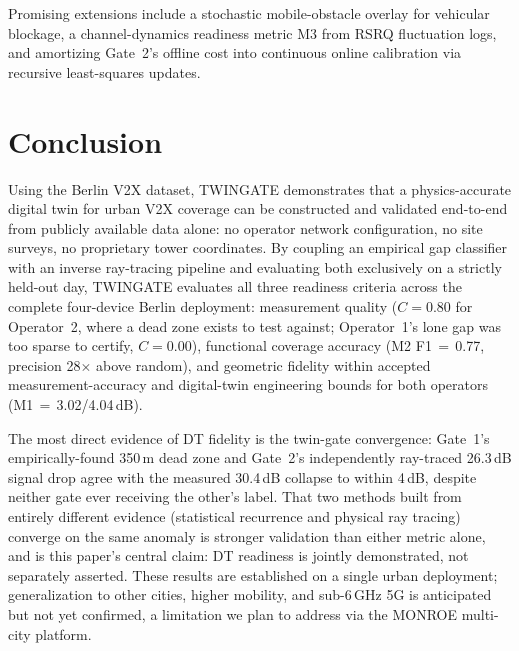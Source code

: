 \documentclass[conference]{IEEEtran}
\begin{document}
Promising extensions include a stochastic mobile-obstacle overlay for
vehicular blockage, a channel-dynamics readiness metric M3 from RSRQ
fluctuation logs, and amortizing Gate~2's offline cost into continuous
online calibration via recursive least-squares updates.

\section{Conclusion}
\label{sec:conclusion}

Using the Berlin V2X dataset, TWINGATE demonstrates that a
physics-accurate digital twin for urban V2X coverage can be constructed
and validated end-to-end from publicly available data alone: no
operator network configuration, no site surveys, no proprietary tower
coordinates.
By coupling an empirical gap classifier with an inverse ray-tracing
pipeline and evaluating both exclusively on a strictly held-out day,
TWINGATE evaluates all three readiness criteria across the complete
four-device Berlin deployment: measurement quality ($C=0.80$ for
Operator~2, where a dead zone exists to test against; Operator~1's
lone gap was too sparse to certify, $C=0.00$), functional coverage
accuracy (M2 F1\,$=$\,0.77, precision 28$\times$
above random), and geometric fidelity within accepted measurement-accuracy
and digital-twin engineering bounds for both operators
(M1\,$=$\,3.02/4.04\,dB).

The most direct evidence of DT fidelity is the twin-gate convergence:
Gate~1's empirically-found 350\,m dead zone and Gate~2's independently
ray-traced 26.3\,dB signal drop agree with the measured 30.4\,dB
collapse to within 4\,dB, despite neither gate ever receiving the
other's label.
That two methods built from entirely different evidence (statistical
recurrence and physical ray tracing) converge on the same anomaly is
stronger validation than either metric alone, and is this paper's
central claim: DT readiness is jointly demonstrated, not separately
asserted.
These results are established on a single urban deployment;
generalization to other cities, higher mobility, and sub-6\,GHz 5G is
anticipated but not yet confirmed, a limitation we plan to address via
the MONROE multi-city platform.

\makeatletter
\let\IEEEtranoldthebibliography\thebibliography
\renewcommand{\thebibliography}[1]{\IEEEtranoldthebibliography{#1}\scriptsize}
\makeatother


\end{document}
